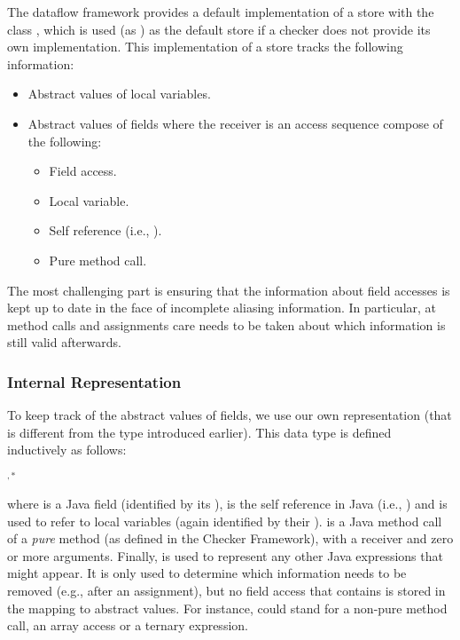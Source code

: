 The dataflow framework provides a default implementation of a store with the
class , which is used (as ) as the
default store if a checker does not provide its own implementation.
This implementation of a store tracks the following information:
\begin{itemize}
	\item Abstract values of local variables.
	\item Abstract values of fields where the receiver is an access sequence
	compose of the following:
	\begin{itemize}
	\item Field access.
	\item Local variable.
	\item Self reference (i.e., ).
	\item Pure method call.
	\end{itemize}
\end{itemize}

The most challenging part is ensuring that the information about
field accesses is kept up to date in the face of incomplete aliasing
information.  In particular, at method calls and assignments care needs to be
taken about which information is still valid afterwards.

\subsubsection{Internal Representation}

To keep track of the abstract values of fields, we use our own representation
(that is different from the  type introduced earlier).  This
data type is defined inductively as follows:

\begin{bnfgrammar}
        { }
        {}
        {  
            \literal{(} $^{,*}$ \literal{)}}
\end{bnfgrammar}

where  is a Java field (identified by its ),
 is the self reference in Java (i.e., )
and  is used to refer to local variables (again
identified by their ).
 is a Java method call of a \textit{pure} method
(as defined in the Checker Framework), with a receiver and zero or more
arguments.  Finally,  is used to represent any other
Java expressions that might appear.  It is only used to determine which
information needs to be removed (e.g., after an assignment), but no field
access that contains  is stored in the mapping to
abstract values.  For instance,  could stand for
a non-pure method call, an array access or a ternary expression.

